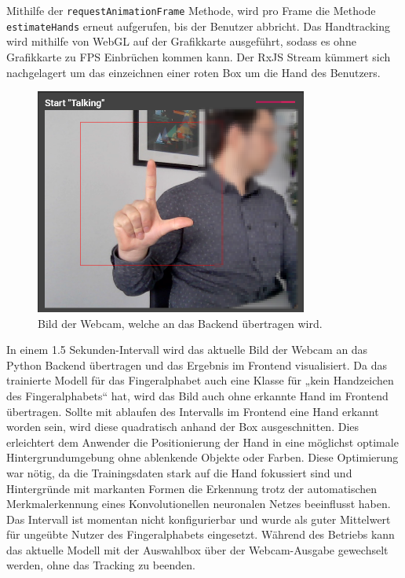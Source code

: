 \documentclass[11pt,bibliography=totocnumbered]{scrartcl}
\begin{document}
Mithilfe der \lstinline[language=pythoninline]|requestAnimationFrame| Methode, wird pro Frame die Methode \lstinline[language=pythoninline]|estimateHands| erneut aufgerufen, bis der Benutzer abbricht. Das Handtracking wird mithilfe von WebGL auf der Grafikkarte ausgeführt, sodass es ohne Grafikkarte zu FPS Einbrüchen kommen kann. Der RxJS Stream kümmert sich nachgelagert um das einzeichnen einer roten Box um die Hand des Benutzers.
\begin{figure}[H]
	\centering
	\includegraphics[width=0.80\textwidth]{webcam_image}
	\vspace*{-3mm}
	\caption[Bild der Webcam]{Bild der Webcam, welche an das Backend übertragen wird.}
	\label{fig:webcam}
\end{figure}
In einem 1.5 Sekunden-Intervall wird das aktuelle Bild der Webcam an das Python Backend übertragen und das Ergebnis im Frontend visualisiert. Da das trainierte Modell für das Fingeralphabet auch eine Klasse für „kein Handzeichen des Fingeralphabets“ hat, wird das Bild auch ohne erkannte Hand im Frontend übertragen. Sollte mit ablaufen des Intervalls im Frontend eine Hand erkannt worden sein, wird diese quadratisch anhand der Box ausgeschnitten. Dies erleichtert dem Anwender die Positionierung der Hand in eine möglichst optimale Hintergrundumgebung ohne ablenkende Objekte oder Farben. Diese Optimierung war nötig, da die Trainingsdaten stark auf die Hand fokussiert sind und Hintergründe mit markanten Formen die Erkennung trotz der automatischen Merkmalerkennung eines Konvolutionellen neuronalen Netzes beeinflusst haben. Das Intervall ist momentan nicht konfigurierbar und wurde als guter Mittelwert für ungeübte Nutzer des Fingeralphabets eingesetzt. Während des Betriebs kann das aktuelle Modell mit der Auswahlbox über der Webcam-Ausgabe gewechselt werden, ohne das Tracking zu beenden. 
\end{document}
